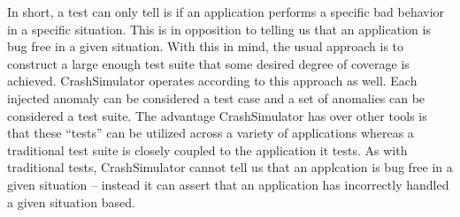     In short, a test can only tell is if an application performs a specific bad behavior in a specific situation.  This
    is in opposition to telling us that an application is bug free in a given situation.  With this in mind, the usual
    approach is to construct a large enough test suite that some desired degree of coverage is achieved.  CrashSimulator
    operates according to this approach as well.  Each injected anomaly can be considered a test case and a set of
    anomalies can be considered a test suite.  The advantage CrashSimulator has over other tools is that these ``tests''
    can be utilized across a variety of applications whereas a traditional test suite is closely coupled to the
    application it tests.  As with traditional tests, CrashSimulator cannot tell us that an applcation is bug free in a
    given situation -- instead it can assert that an application has incorrectly handled a given situation based.
